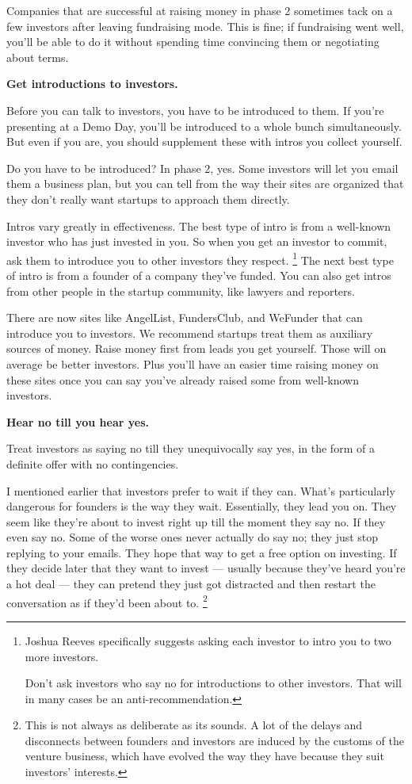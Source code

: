 Companies that are successful at raising money in phase 2 sometimes tack
on a few investors after leaving fundraising mode. This is fine; if
fundraising went well, you'll be able to do it without spending time
convincing them or negotiating about terms.

\textbf{Get introductions to investors.}

Before you can talk to investors, you have to be introduced to them. If
you're presenting at a Demo Day, you'll be introduced to a whole bunch
simultaneously. But even if you are, you should supplement these with
intros you collect yourself.

Do you have to be introduced? In phase 2, yes. Some investors will let
you email them a business plan, but you can tell from the way their
sites are organized that they don't really want startups to approach
them directly.

Intros vary greatly in effectiveness. The best type of intro is from a
well-known investor who has just invested in you. So when you get an
investor to commit, ask them to introduce you to other investors they
respect. \footnote{Joshua Reeves specifically suggests asking each investor to
intro you to two more investors.

Don't ask investors who say no for introductions to other investors.
That will in many cases be an anti-recommendation.} The next best type of intro is from a
founder of a company they've funded. You can also get intros from other
people in the startup community, like lawyers and reporters.

There are now sites like AngelList, FundersClub, and WeFunder that can
introduce you to investors. We recommend startups treat them as
auxiliary sources of money. Raise money first from leads you get
yourself. Those will on average be better investors. Plus you'll have an
easier time raising money on these sites once you can say you've already
raised some from well-known investors.

\textbf{Hear no till you hear yes.}

Treat investors as saying no till they unequivocally say yes, in the
form of a definite offer with no contingencies.

I mentioned earlier that investors prefer to wait if they can. What's
particularly dangerous for founders is the way they wait. Essentially,
they lead you on. They seem like they're about to invest right up till
the moment they say no. If they even say no. Some of the worse ones
never actually do say no; they just stop replying to your emails. They
hope that way to get a free option on investing. If they decide later
that they want to invest --- usually because they've heard you're a hot
deal --- they can pretend they just got distracted and then restart the
conversation as if they'd been about to. \footnote{This is not always as deliberate as its sounds. A lot of the
delays and disconnects between founders and investors are induced by the
customs of the venture business, which have evolved the way they have
because they suit investors' interests.}

